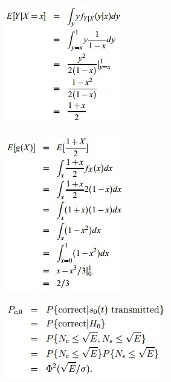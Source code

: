 \documentclass[11pt,landscape]{article}
\begin{document}
\begin{multicols}{3}
\begin{figure}[H]
\end{figure}
\begin{figure}[H]
    \includegraphics[scale=0.75]{./Images/2/sleep2.jpg}
\end{figure}
\begin{figure}[H]
    \includegraphics[scale=0.75]{./Images/2/sleep3.jpg}
\end{figure}
\begin{figure}[H]
    \includegraphics[scale=0.75]{./Images/2/hw7_1.jpg}
\end{figure}

\end{multicols}
\end{document}
